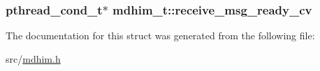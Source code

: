 \hypertarget{structmdhim__t_ac4a79eb13f34377840b924c41802f0fb}{
\subsubsection[{receive\-\_\-msg\-\_\-ready\-\_\-cv}]{\setlength{\rightskip}{0pt plus 5cm}pthread\-\_\-cond\-\_\-t$\ast$ mdhim\-\_\-t\-::receive\-\_\-msg\-\_\-ready\-\_\-cv}}\label{d8/dbc/structmdhim__t_ac4a79eb13f34377840b924c41802f0fb}


The documentation for this struct was generated from the following file\-:\begin{DoxyCompactItemize}
\item 
src/\hyperlink{mdhim_8h}{mdhim.\-h}\end{DoxyCompactItemize}
